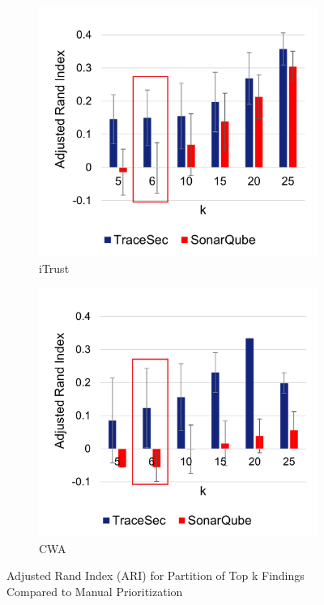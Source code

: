 \begin{figure}
	\begin{center}
	\begin{subfigure}{.5\textwidth}
		\begin{center}
		\includegraphics[width=.9\linewidth]{figures/topKiTrust}
		\caption{iTrust}
		\label{topKiTrust}
		\end{center}%
	\end{subfigure}%
	\begin{subfigure}{.5\textwidth}
		\begin{center}
		\includegraphics[width=.9\linewidth]{figures/topKcwa}%
		\caption{CWA}
		\label{topKCWA}
		\end{center}
	\end{subfigure}
	\caption{Adjusted Rand Index (ARI) for Partition of Top k Findings Compared to Manual Prioritization}
	\label{topK}
	\end{center}
\end{figure}

